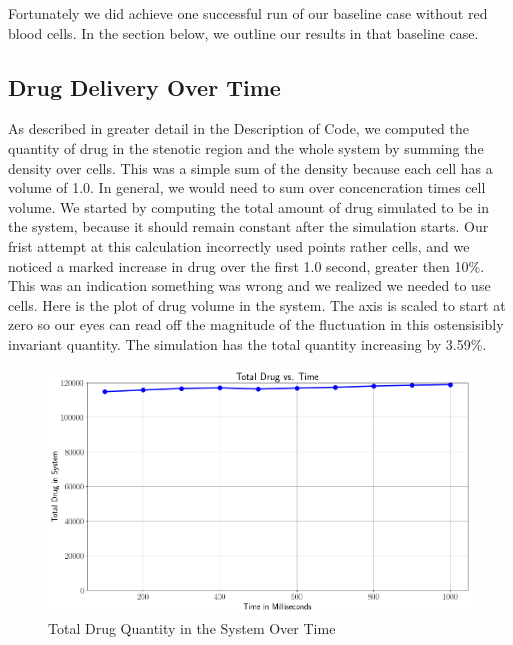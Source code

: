 \documentclass[11pt]{article} %
\begin{document}
Fortunately we did achieve one successful run of our baseline case without red blood cells.
In the section below, we outline our results in that baseline case.

\subsection{Drug Delivery Over Time}
As described in greater detail in the Description of Code, we computed the quantity of drug
in the stenotic region and the whole system by summing the density over cells.
This was a simple sum of the density because each cell has a volume of 1.0.
In general, we would need to sum over concencration times cell volume.
We started by computing the total amount of drug simulated to be in the system,
because it should remain constant after the simulation starts.
Our frist attempt at this calculation incorrectly used points rather cells, and we noticed
 a marked increase in drug over the first 1.0 second, greater then 10\%.
This was an indication something was wrong and we realized we needed to use cells.
Here is the plot of drug volume in the system.  
The axis is scaled to start at zero so our eyes can read off the magnitude of the fluctuation
in this ostensisibly invariant quantity.  
The simulation has the total quantity increasing by 3.59\%.
\begin{figure}[h!]
\centering
\includegraphics[width=1.00\textwidth]{drug_tot.png}
\caption{Total Drug Quantity in the System Over Time}
\end{figure}
\end{document}
